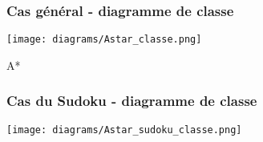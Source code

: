 
\begin{frame}
	\frametitle{Cas général - diagramme de classe}

\begin{center}

\texttt{[image: diagrams/Astar\_classe.png]}

\end{center}

\end{frame}


\begin{frame}{A*}

\frametitle{Cas du Sudoku - diagramme de classe}

\begin{center}

\texttt{[image: diagrams/Astar\_sudoku\_classe.png]}

\end{center}

\end{frame}
